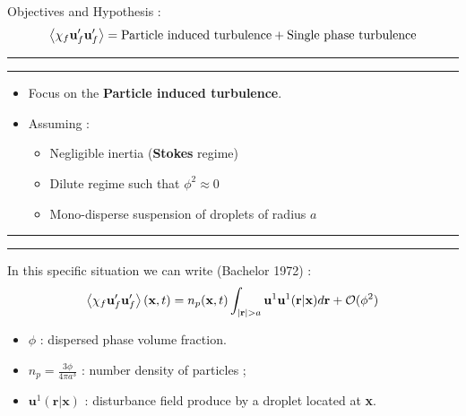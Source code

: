 \documentclass{sintefbeamer}
\begin{document}
\begin{frame}{Objectives and Hypothesis :}
  \begin{equation*}
     \left<\chi_f \textbf{u}_f'\textbf{u}_f'\right>
     = 
     \text{Particle induced turbulence}
     + \text{Single phase turbulence}
  \end{equation*}
  \hrule\hrule
  \pause
  \begin{itemize}
    \item 
    Focus on the \textbf{Particle induced turbulence}. 
    \item Assuming : 
    \begin{itemize}
      \item Negligible inertia (\textbf{Stokes} regime)
      \item Dilute regime such that $\phi^{2} \approx 0$ 
      \item Mono-disperse suspension of droplets of radius $a$
    \end{itemize}
  \end{itemize}
\hrule\hrule
  \pause
  In this specific situation we can write  (Bachelor 1972) :
  \begin{equation*}
    \left<\chi_f \textbf{u}'_f\textbf{u}'_f\right>(\textbf{x},t)
    = 
    n_p(\textbf{x},t)
    \int_{|\textbf{r}| > a }
     \textbf{u}^1\textbf{u}^1(\textbf{r}|\textbf{x}) d\textbf{r}
    +\mathcal{O}(\phi^2)
\end{equation*}

\begin{itemize}
  \item $\phi$ : dispersed phase volume fraction.
  \item $n_p = \frac{3\phi}{4\pi a^3}$ : number density of particles ;
  \item $\textbf{u}^1(\textbf{r}|\textbf{x})$ : disturbance field produce by a droplet located at \textbf{x}. 
\end{itemize}
\end{frame}
\end{document}
